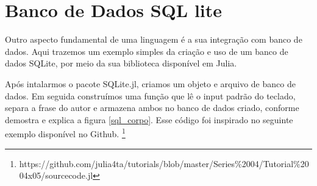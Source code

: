 


\section{Banco de Dados SQL lite}
Outro aspecto fundamental de uma linguagem é a sua integração com banco de dados. Aqui trazemos um exemplo simples da criação e uso de um banco de dados SQLite, por meio da sua biblioteca disponível em Julia. 

Após intalarmos o pacote SQLite.jl, criamos um objeto e arquivo de banco de dados. Em seguida construímos uma função que lê o input padrão do teclado, separa a frase do autor e armazena ambos no banco de dados criado, conforme demostra e explica a figura \ref{sql_corpo}.
Esse código foi inspirado no seguinte exemplo disponível no Github. \footnote{https://github.com/julia4ta/tutorials/blob/master/Series\%2004/Tutorial\%2004x05/sourcecode.jl}


